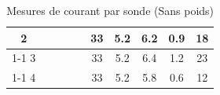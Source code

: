 \begin{table}[H]
{\begin{tabular}{|c|c|c|c|c|c|c|c|c|c|}
            2         &                                                            &                           &                                                                                        &                                                          & 33                                                      & 5.2                                                                 & 6.2                                                              & 0.9    & 18                                                                 \\ \cline{1-1} \cline{6-10}
            3         &                                                            &                           &                                                                                        &                                                          & 33                                                      & 5.2                                                                 & 6.4                                                              & 1.2    & 23                                                                 \\ \cline{1-1} \cline{6-10}
            4         &                                                            &                           &                                                                                        &                                                          & 33                                                      & 5.2                                                                 & 5.8                                                              & 0.6    & 12                                                                 \\ \hline
        \end{tabular}%
    }
    \caption{Mesures de courant par sonde (Sans poids)}
    \label{tab:sans_poids_sonde}
\end{table}

